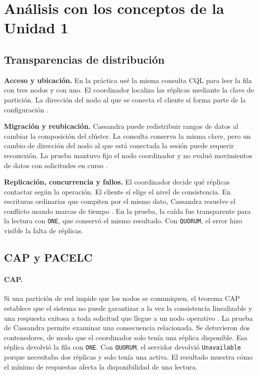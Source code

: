\documentclass[11pt,a4paper]{article}
\begin{document}
\section{Análisis con los conceptos de la Unidad 1}
\subsection{Transparencias de distribución}
\textbf{Acceso y ubicación.} En la práctica usé la misma consulta CQL para leer la fila con tres nodos y con uno. El coordinador localiza las réplicas mediante la clave de partición. La dirección del nodo al que se conecta el cliente sí forma parte de la configuración \cite{cassandra5dynamo}.

\textbf{Migración y reubicación.} Cassandra puede redistribuir rangos de datos al cambiar la composición del clúster. La consulta conserva la misma clave, pero un cambio de dirección del nodo al que está conectada la sesión puede requerir reconexión. La prueba mantuvo fijo el nodo coordinador y no evaluó movimientos de datos con solicitudes en curso \cite{cassandra5dynamo}.

\textbf{Replicación, concurrencia y fallos.} El coordinador decide qué réplicas contactar según la operación. El cliente sí elige el nivel de consistencia. En escrituras ordinarias que compiten por el mismo dato, Cassandra resuelve el conflicto usando marcas de tiempo \cite{cassandra5dynamo}. En la prueba, la caída fue transparente para la lectura con \texttt{ONE}, que conservó el mismo resultado. Con \texttt{QUORUM}, el error hizo visible la falta de réplicas.
\subsection{CAP y PACELC}
\paragraph{CAP.} Si una partición de red impide que los nodos se comuniquen, el teorema CAP establece que el sistema no puede garantizar a la vez la consistencia linealizable y una respuesta exitosa a toda solicitud que llegue a un nodo operativo \cite{gilbert2002cap}. La prueba de Cassandra permite examinar una consecuencia relacionada. Se detuvieron dos contenedores, de modo que el coordinador solo tenía una réplica disponible. Esa réplica devolvió la fila con \texttt{ONE}. Con \texttt{QUORUM}, el servidor devolvió \texttt{Unavailable} porque necesitaba dos réplicas y solo tenía una activa. El resultado muestra cómo el mínimo de respuestas afecta la disponibilidad de una lectura.
\end{document}
